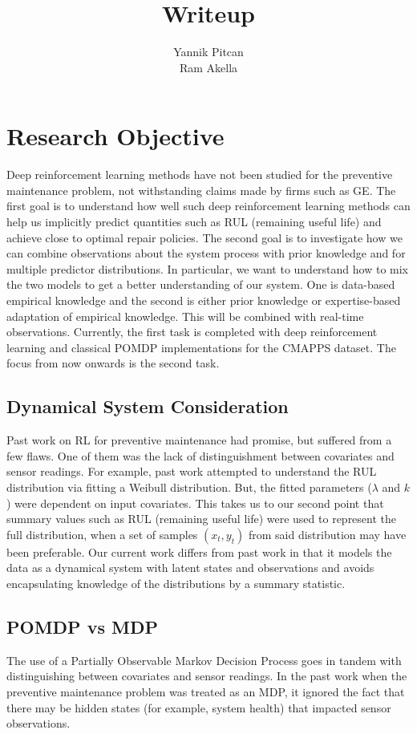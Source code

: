 \documentclass[english]{article}
\numberwithin{equation}{section}
\begin{document}
	
	\title{Writeup}
	
	\author{Yannik Pitcan \\
		Ram Akella
	}
	\maketitle
	
	\section*{Research Objective}
	Deep reinforcement learning methods have not been studied for the preventive maintenance problem, not withstanding claims made by firms such as GE. The first goal is to understand how well such deep reinforcement learning methods can help us implicitly predict quantities such as RUL (remaining useful life) and achieve close to optimal repair policies. The second goal is to investigate how we can combine observations about the system process with prior knowledge and for multiple predictor distributions. In particular, we want to understand how to mix the two models to get a better understanding of our system. One is data-based empirical knowledge and the second is either prior knowledge or expertise-based adaptation of empirical knowledge. This will be combined with real-time observations. Currently, the first task is completed with deep reinforcement learning and classical POMDP implementations for the CMAPPS dataset. The focus from now onwards is the second task.
	
	\subsection*{Dynamical System Consideration}
	Past work on RL for preventive maintenance had promise, but suffered from a few flaws. One of them was the lack of distinguishment between covariates and sensor readings. For example, past work attempted to understand the RUL distribution via fitting a Weibull distribution. But, the fitted parameters ($\lambda$ and $k$) were dependent on input covariates. This takes us to our second point that summary values such as RUL (remaining useful life) were used to represent the full distribution, when a set of samples $(x_t,y_t)$ from said distribution may have been preferable. Our current work differs from past work in that it models the data as a dynamical system with latent states and observations and avoids encapsulating knowledge of the distributions by a summary statistic.
	\subsection*{POMDP vs MDP}
	The use of a Partially Observable Markov Decision Process goes in tandem with distinguishing between covariates and sensor readings. In the past work when the preventive maintenance problem was treated as an MDP, it ignored the fact that there may be hidden states (for example, system health) that impacted sensor observations.
	
\end{document}
